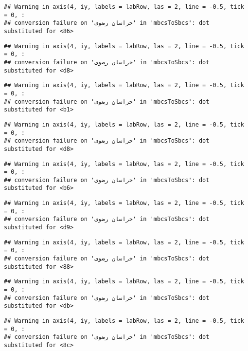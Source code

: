 \documentclass[
]{article}
\begin{document}
\begin{verbatim}
## Warning in axis(4, iy, labels = labRow, las = 2, line = -0.5, tick = 0, :
## conversion failure on 'خراسان رضوی' in 'mbcsToSbcs': dot substituted for <86>
\end{verbatim}

\begin{verbatim}
## Warning in axis(4, iy, labels = labRow, las = 2, line = -0.5, tick = 0, :
## conversion failure on 'خراسان رضوی' in 'mbcsToSbcs': dot substituted for <d8>
\end{verbatim}

\begin{verbatim}
## Warning in axis(4, iy, labels = labRow, las = 2, line = -0.5, tick = 0, :
## conversion failure on 'خراسان رضوی' in 'mbcsToSbcs': dot substituted for <b1>
\end{verbatim}

\begin{verbatim}
## Warning in axis(4, iy, labels = labRow, las = 2, line = -0.5, tick = 0, :
## conversion failure on 'خراسان رضوی' in 'mbcsToSbcs': dot substituted for <d8>
\end{verbatim}

\begin{verbatim}
## Warning in axis(4, iy, labels = labRow, las = 2, line = -0.5, tick = 0, :
## conversion failure on 'خراسان رضوی' in 'mbcsToSbcs': dot substituted for <b6>
\end{verbatim}

\begin{verbatim}
## Warning in axis(4, iy, labels = labRow, las = 2, line = -0.5, tick = 0, :
## conversion failure on 'خراسان رضوی' in 'mbcsToSbcs': dot substituted for <d9>
\end{verbatim}

\begin{verbatim}
## Warning in axis(4, iy, labels = labRow, las = 2, line = -0.5, tick = 0, :
## conversion failure on 'خراسان رضوی' in 'mbcsToSbcs': dot substituted for <88>
\end{verbatim}

\begin{verbatim}
## Warning in axis(4, iy, labels = labRow, las = 2, line = -0.5, tick = 0, :
## conversion failure on 'خراسان رضوی' in 'mbcsToSbcs': dot substituted for <db>
\end{verbatim}

\begin{verbatim}
## Warning in axis(4, iy, labels = labRow, las = 2, line = -0.5, tick = 0, :
## conversion failure on 'خراسان رضوی' in 'mbcsToSbcs': dot substituted for <8c>
\end{verbatim}
\end{document}
